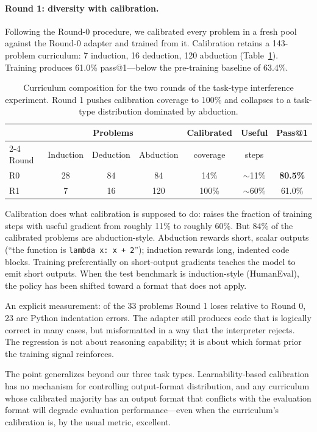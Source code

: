 \documentclass[11pt,a4paper]{article}
\begin{document}
\paragraph{Round 1: diversity with calibration.}
Following the Round-0 procedure, we calibrated every problem in a fresh pool against the Round-0 adapter and trained from it.
Calibration retains a 143-problem curriculum: 7 induction, 16 deduction, 120 abduction (Table~\ref{tab:r0r1}).
Training produces 61.0\% pass@1---below the pre-training baseline of 63.4\%.

\begin{table}[ht]
\centering
\caption{Curriculum composition for the two rounds of the task-type interference experiment. Round 1 pushes calibration coverage to 100\% and collapses to a task-type distribution dominated by abduction.}
\label{tab:r0r1}
\begin{tabular}{lcccccc}
\toprule
 & \multicolumn{3}{c}{Problems} & \multicolumn{1}{c}{Calibrated} & Useful & \multirow{2}{*}{Pass@1} \\
\cmidrule(lr){2-4}
Round & Induction & Deduction & Abduction & coverage & steps & \\
\midrule
R0 & 28 & 84 & 84 & 14\% & $\sim$11\% & \textbf{80.5\%} \\
R1 & 7 & 16 & 120 & 100\% & $\sim$60\% & 61.0\% \\
\bottomrule
\end{tabular}
\end{table}

Calibration does what calibration is supposed to do: raises the fraction of training steps with useful gradient from roughly 11\% to roughly 60\%.
But 84\% of the calibrated problems are abduction-style.
Abduction rewards short, scalar outputs (``the function is \texttt{lambda x: x + 2}''); induction rewards long, indented code blocks.
Training preferentially on short-output gradients teaches the model to emit short outputs.
When the test benchmark is induction-style (HumanEval), the policy has been shifted toward a format that does not apply.

An explicit measurement: of the 33 problems Round 1 loses relative to Round 0, 23 are Python indentation errors.
The adapter still produces code that is logically correct in many cases, but misformatted in a way that the interpreter rejects.
The regression is not about reasoning capability; it is about which format prior the training signal reinforces.

The point generalizes beyond our three task types.
Learnability-based calibration has no mechanism for controlling output-format distribution, and any curriculum whose calibrated majority has an output format that conflicts with the evaluation format will degrade evaluation performance---even when the curriculum's calibration is, by the usual metric, excellent.
\end{document}
